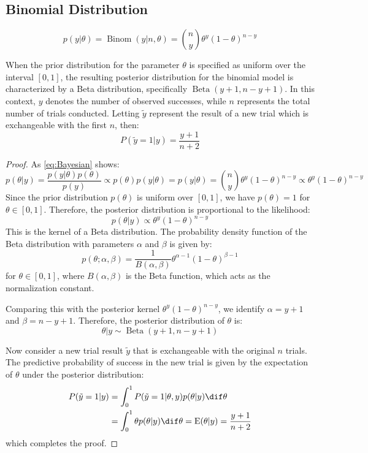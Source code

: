 \subsection{Binomial Distribution}
\begin{equation*}
	p(y|\theta)=\operatorname{Binom}(y|n,\theta)=\binom{n}{y}\theta^y(1-\theta)^{n-y}
\end{equation*}
\begin{theorem}
	When the prior distribution for the parameter $\theta$ is specified as uniform over the interval $[0,1]$, the resulting posterior distribution for the binomial model is characterized by a Beta distribution, specifically $\operatorname{Beta}(y+1, n-y+1)$. In this context, $y$ denotes the number of observed successes, while $n$ represents the total number of trials conducted. Letting $\tilde{y}$ represent the result of a new trial which is exchangeable with the first $n$, then:
	\begin{equation*}
		P(\tilde{y}=1| y)=\frac{y+1}{n+2}
	\end{equation*}
\end{theorem}
\begin{proof}
	As \cref{eq:Bayesian} shows:
	\begin{equation*}
		p(\theta | y) = \frac{p(y | \theta) p(\theta)}{p(y)} \propto p(\theta) p(y | \theta) = p(y | \theta) = \binom{n}{y} \theta^y (1 - \theta)^{n - y} \propto \theta^y (1 - \theta)^{n - y}
	\end{equation*}
	Since the prior distribution $p(\theta)$ is uniform over $[0,1]$, we have $p(\theta) = 1$ for $\theta \in [0,1]$. Therefore, the posterior distribution is proportional to the likelihood:
	\[
	p(\theta | y) \propto \theta^y(1 - \theta)^{n - y}
	\]
	This is the kernel of a Beta distribution. The probability density function of the Beta distribution with parameters $\alpha$ and $\beta$ is given by:
	\[
	p(\theta ; \alpha, \beta) = \frac{1}{B(\alpha, \beta)} \theta^{\alpha - 1} (1 - \theta)^{\beta - 1}
	\]
	for $\theta \in [0,1]$, where $B(\alpha, \beta)$ is the Beta function, which acts as the normalization constant.
	
	Comparing this with the posterior kernel $\theta^y(1 - \theta)^{n - y}$, we identify $\alpha = y + 1$ and $\beta = n - y + 1$. Therefore, the posterior distribution of $\theta$ is:
	\[
	\theta | y \sim \operatorname{Beta}(y + 1, n - y + 1)
	\]
	
	Now consider a new trial result $\tilde{y}$ that is exchangeable with the original $n$ trials. The predictive probability of success in the new trial is given by the expectation of $\theta$ under the posterior distribution:
	\begin{align*}
		P(\tilde{y} = 1 | y) &= \int_0^1 P(\tilde{y} = 1 | \theta, y)p(\theta | y)\dif\theta \\
		&= \int_0^1 \theta p(\theta | y)\dif\theta = \operatorname{E}(\theta | y) = \frac{y + 1}{n + 2}
	\end{align*}
	which completes the proof.
\end{proof}
